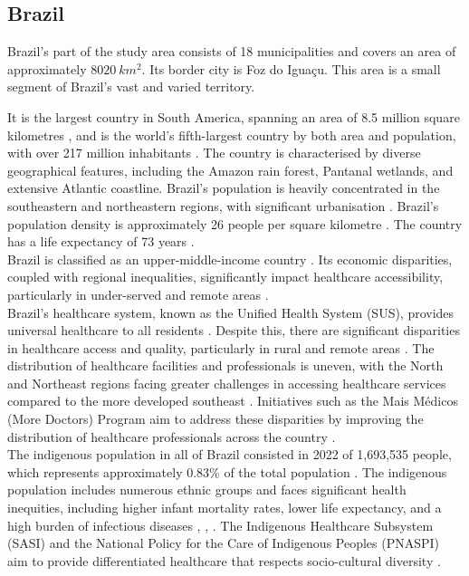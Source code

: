 \documentclass[11pt, a4paper]{report}
\begin{document}
\subsection{Brazil}
Brazil's part of the study area consists of  18 municipalities and covers an area of approximately $8020 \ km^2$. Its border city is Foz do Iguaçu. This area is a small segment of Brazil's vast and varied territory.

It is the largest country in South America, spanning an area of 8.5 million square kilometres \citep{runfola_geoboundaries_2020}, and is the world's fifth-largest country by both area and population, with over 217 million inhabitants \citep{united_nations_world_2022}. The country is characterised by diverse geographical features, including the Amazon rain forest, Pantanal wetlands, and extensive Atlantic coastline. Brazil's population is heavily concentrated in the southeastern and northeastern regions, with significant urbanisation \citep{agencia_de_noticias_-_ibge_between_2023}. Brazil's population density is approximately 26 people per square kilometre \citep{united_nations_world_2022}. The country has a life expectancy of 73 years \citep{world_bank_life_2022}.  \\
%
Brazil is classified as an upper-middle-income country \citep{world_bank_world_2022}. Its economic disparities, coupled with regional inequalities, significantly impact healthcare accessibility, particularly in under-served and remote areas \citep{hone_effect_2019}.  \\
%
Brazil's healthcare system, known as the Unified Health System (SUS), provides universal healthcare to all residents \citep{oliveira_challenges_2017}. Despite this, there are significant disparities in healthcare access and quality, particularly in rural and remote areas \citep{palmeira_analysis_2022}. The distribution of healthcare facilities and professionals is uneven, with the North and Northeast regions facing greater challenges in accessing healthcare services compared to the more developed southeast \citep{silva_emergency_2021}. Initiatives such as the Mais Médicos (More Doctors) Program aim to address these disparities by improving the distribution of healthcare professionals across the country \citep{oliveira_challenges_2017}. \\
%
The indigenous population in all of Brazil consisted  in 2022  of 1,693,535 people, which represents approximately 0.83\% of the total population \citep{berger_indigenous_2024}. The indigenous population includes numerous ethnic groups and faces significant health inequities, including higher infant mortality rates, lower life expectancy, and a high burden of infectious diseases \citep{berger_indigenous_2024}, \citep{santos_health_2022}, \citep{mendes_o_2018}. The Indigenous Healthcare Subsystem (SASI) and the National Policy for the Care of Indigenous Peoples (PNASPI) aim to provide differentiated healthcare that respects socio-cultural diversity \citep{de_m_pontes_health_2020}. 
\end{document}
